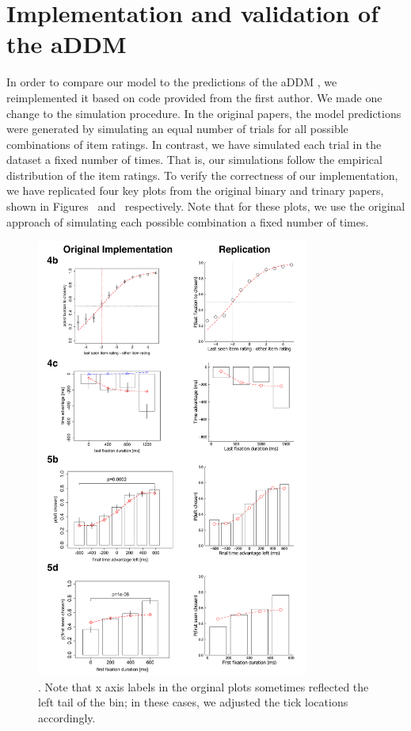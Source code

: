 \section{Implementation and validation of the aDDM}\label{app:attention-addm}


In order to compare our model to the predictions of the aDDM \citep{krajbich2010visual,krajbich2011multialternative}, we reimplemented it based on code provided from the first author. We made one change to the simulation procedure. In the original papers, the model predictions were generated by simulating an equal number of trials for all possible combinations of item ratings. In contrast, we have simulated each trial in the dataset a fixed number of times. That is, our simulations follow the empirical distribution of the item ratings. To verify the correctness of our implementation, we have replicated four key plots from the original binary and trinary papers, shown in Figures~ and~ respectively. Note that for these plots, we use the original approach of simulating each possible combination a fixed number of times.



\begin{figure}[tb!]
  \centering
  \includegraphics[width=0.8\textwidth]{figs/attention/supp-addm-replication-binary.pdf}
  \caption{.
    Note that x axis labels in the orginal plots sometimes reflected the left tail of the bin; in these cases, we adjusted the tick locations accordingly.
  }
  \label{fig:attention-addm2}
\end{figure}

